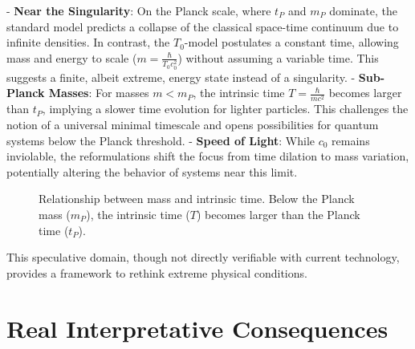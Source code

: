 \documentclass[a4paper,12pt]{article}
\begin{document}
	- \textbf{Near the Singularity}: On the Planck scale, where \( t_P \) and \( m_P \) dominate, the standard model predicts a collapse of the classical space-time continuum due to infinite densities. In contrast, the \( T_0 \)-model postulates a constant time, allowing mass and energy to scale (\( m = \frac{\hbar}{T_0 c_0^2} \)) without assuming a variable time. This suggests a finite, albeit extreme, energy state instead of a singularity.
	- \textbf{Sub-Planck Masses}: For masses \( m < m_P \), the intrinsic time \( T = \frac{\hbar}{m c^2} \) becomes larger than \( t_P \), implying a slower time evolution for lighter particles. This challenges the notion of a universal minimal timescale and opens possibilities for quantum systems below the Planck threshold.
	- \textbf{Speed of Light}: While \( c_0 \) remains inviolable, the reformulations shift the focus from time dilation to mass variation, potentially altering the behavior of systems near this limit.
	
	\begin{figure}[h]
		\centering
		\caption{Relationship between mass and intrinsic time. Below the Planck mass ($m_P$), the intrinsic time ($T$) becomes larger than the Planck time ($t_P$).}
	\end{figure}
	
	This speculative domain, though not directly verifiable with current technology, provides a framework to rethink extreme physical conditions.
	
	\section{Real Interpretative Consequences}
	
\end{document}

